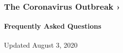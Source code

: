 \href{https://www.nytimes3xbfgragh.onion/news-event/coronavirus?action=click\&pgtype=Article\&state=default\&region=MAIN_CONTENT_3\&context=storylines_faq}{}

\hypertarget{the-coronavirus-outbreak-}{%
\subsubsection{The Coronavirus Outbreak
›}\label{the-coronavirus-outbreak-}}

\hypertarget{frequently-asked-questions}{%
\paragraph{Frequently Asked
Questions}\label{frequently-asked-questions}}

Updated August 3, 2020

